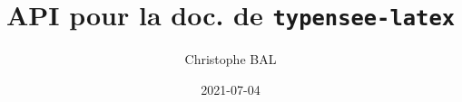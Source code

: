 \documentclass[12pt,a4paper]{article}
\begin{document}
\title{%
	API pour la doc. de \texttt{typensee-latex}
}
\author{Christophe BAL}
\date{2021-07-04}

\maketitle

\tableofcontents

\newpage













\end{document}
